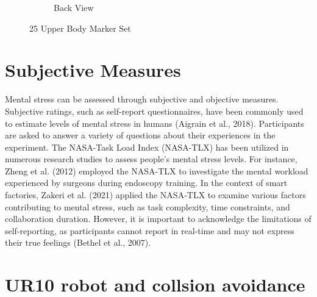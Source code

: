 \begin{figure}[h]
\begin{subfigure}[b]{0.45\columnwidth}
        \caption{Back View }
        \label{fig:phone2}
    \end{subfigure}
    \caption{25 Upper Body Marker Set}
    \label{fig:phone}
\end{figure}

\section{Subjective Measures}
Mental stress can be assessed through subjective and objective
measures. Subjective ratings, such as self-report questionnaires, have
been commonly used to estimate levels of mental stress in humans
(Aigrain et al., 2018). Participants are asked to answer a variety of
questions about their experiences in the experiment. The NASA-Task
Load Index (NASA-TLX) has been utilized in numerous research
studies to assess people’s mental stress levels. For instance, Zheng et al.
(2012) employed the NASA-TLX to investigate the mental workload
experienced by surgeons during endoscopy training. In the context of
smart factories, Zakeri et al. (2021) applied the NASA-TLX to examine
various factors contributing to mental stress, such as task complexity,
time constraints, and collaboration duration. However, it is important to
acknowledge the limitations of self-reporting, as participants cannot
report in real-time and may not express their true feelings (Bethel et al.,
2007). 


\section{UR10 robot and collsion avoidance }


